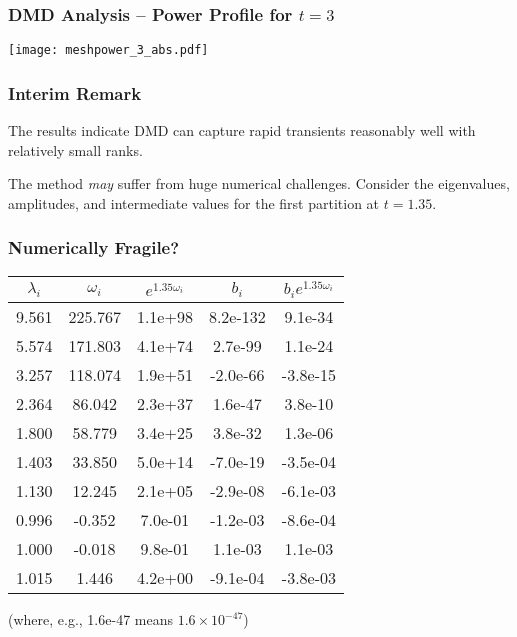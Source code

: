 \documentclass[fleqn]{beamer}
\begin{document}
\begin{frame}
\frametitle{DMD Analysis -- Power Profile for $t = 3$}

\texttt{[image: meshpower\_3\_abs.pdf]}
 
\end{frame}

\begin{frame}
\frametitle{Interim Remark}

The results indicate DMD can capture rapid transients reasonably
well with relatively small ranks.

\vfill
\pause

The method {\it may} suffer from huge numerical challenges.  Consider the
eigenvalues, amplitudes, and intermediate values for the first partition at $t = 1.35$.

\vfill 

\end{frame}

\begin{frame}
\frametitle{Numerically Fragile?}
 
\begin{tabular}{|c|c|c|c|c|}
\hline
 $\lambda_i$ & $\omega_i$ & $e^{1.35 \omega_i}$ & $b_i$ & $b_i e^{1.35 \omega_i}$ \\
\hline
 9.561  & 225.767 & 1.1e+98 & 8.2e-132 & 9.1e-34  \\
 5.574  & 171.803 & 4.1e+74 & 2.7e-99 & 1.1e-24  \\
 3.257  & 118.074 & 1.9e+51 & -2.0e-66 & -3.8e-15  \\
 2.364  & 86.042 & 2.3e+37 & 1.6e-47 & 3.8e-10  \\
 1.800  & 58.779 & 3.4e+25 & 3.8e-32 & 1.3e-06  \\
 1.403  & 33.850 & 5.0e+14 & -7.0e-19 & -3.5e-04  \\
 1.130  & 12.245 & 2.1e+05 & -2.9e-08 & -6.1e-03  \\
 0.996  & -0.352 & 7.0e-01 & -1.2e-03 & -8.6e-04  \\
 1.000  & -0.018 & 9.8e-01 & 1.1e-03 & 1.1e-03  \\
 1.015  & 1.446 & 4.2e+00 & -9.1e-04 & -3.8e-03  \\
\hline
\end{tabular}

{\small
(where, e.g., 1.6e-47 means $1.6\times 10^{-47}$)}
 
\end{frame}
\end{document}

